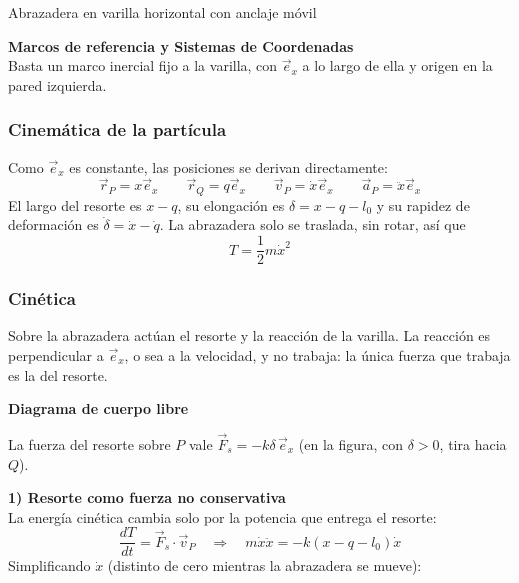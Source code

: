 \begin{solucion}{Abrazadera en varilla horizontal con anclaje móvil}

\textbf{Marcos de referencia y Sistemas de Coordenadas}\\
Basta un marco inercial fijo a la varilla, con $\vec{e}_x$ a lo largo de ella y origen en la pared izquierda.

\subsubsection*{Cinemática de la partícula}
Como $\vec{e}_x$ es constante, las posiciones se derivan directamente:
$$\vec{r}_P=x\vec{e}_x\qquad\vec{r}_Q=q\vec{e}_x\qquad\vec{v}_P=\dot{x}\vec{e}_x\qquad\vec{a}_P=\ddot{x}\vec{e}_x$$
El largo del resorte es $x-q$, su elongación es $\delta=x-q-l_0$ y su rapidez de deformación es $\dot\delta=\dot{x}-\dot{q}$. La abrazadera solo se traslada, sin rotar, así que
$$T=\frac{1}{2}m\dot{x}^2$$

\subsubsection*{Cinética}
Sobre la abrazadera actúan el resorte y la reacción de la varilla. La reacción es perpendicular a $\vec{e}_x$, o sea a la velocidad, y no trabaja: la única fuerza que trabaja es la del resorte.

\textbf{Diagrama de cuerpo libre}
\begin{center}
\end{center}
La fuerza del resorte sobre $P$ vale $\vec{F}_s=-k\delta\,\vec{e}_x$ (en la figura, con $\delta>0$, tira hacia $Q$).

\textbf{1) Resorte como fuerza no conservativa}\\
La energía cinética cambia solo por la potencia que entrega el resorte:
$$\frac{dT}{dt}=\vec{F}_s\cdot\vec{v}_P\quad\Longrightarrow\quad m\dot{x}\ddot{x}=-k\left(x-q-l_0\right)\dot{x}$$
Simplificando $\dot{x}$ (distinto de cero mientras la abrazadera se mueve):


\end{solucion}
